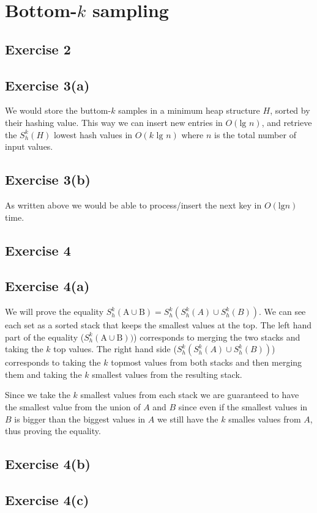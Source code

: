 \section{Bottom-$k$ sampling}

\subsection{Exercise 2}

\subsection{Exercise 3(a)}
We would store the buttom-$k$ samples in a minimum heap structure $H$, sorted by
their hashing value. This way we can insert new entries in $O(\text{lg } n)$,
and retrieve the $S^{k}_{h}(H)$ lowest hash values in $O(k \text{ lg } n)$ where
$n$ is the total number of input values.

\subsection{Exercise 3(b)}
As written above we would be able to process/insert the next key in $O(\text{lg
} n)$ time.


\subsection{Exercise 4}
\subsection{Exercise 4(a)}
We will prove the equality $S^{k}_{h}(\text{A} \cup \text{B}) =
S^{k}_{h}(S^{k}_{h}(A) \cup S^{k}_{h}(B))$.
%
We can see each set as a sorted stack that keeps the smallest values at the
top. The left hand part of the equality ($S^{k}_{h}(\text{A} \cup \text{B}))$)
corresponds to merging the two stacks and taking the $k$ top values.
%
The right hand side ($S^{k}_{h}(S^{k}_{h}(A) \cup S^{k}_{h}(B))$) corresponds to
taking the $k$ topmost values from both stacks and then merging them and taking
the $k$ smallest values from the resulting stack.

Since we take the $k$ smallest values from each stack we are guaranteed to have
the smallest value from the union of $A$ and $B$ since even if the smallest
values in $B$ is bigger than the biggest values in $A$ we still have the $k$
smalles values from $A$, thus proving the equality.

\subsection{Exercise 4(b)}




\subsection{Exercise 4(c)}